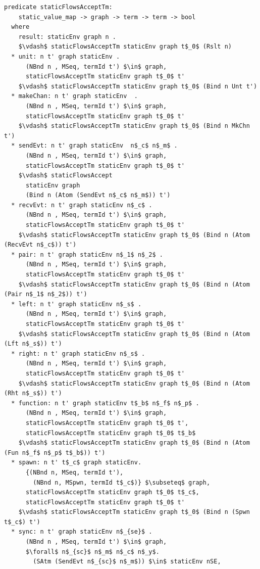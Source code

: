 \documentclass[letterpaper, 11pt]{extarticle}
\begin{document}
\begin{lstlisting}[language=logic, mathescape]
  predicate staticFlowsAcceptTm:
    static_value_map -> graph -> term -> term -> bool
  where
    result: staticEnv graph n .
    $\vdash$ staticFlowsAcceptTm staticEnv graph t$_0$ (Rslt n)
  * unit: n t' graph staticEnv .
      (NBnd n , MSeq, termId t') $\in$ graph,
      staticFlowsAcceptTm staticEnv graph t$_0$ t'
    $\vdash$ staticFlowsAcceptTm staticEnv graph t$_0$ (Bind n Unt t')
  * makeChan: n t' graph staticEnv  .
      (NBnd n , MSeq, termId t') $\in$ graph,
      staticFlowsAcceptTm staticEnv graph t$_0$ t'
    $\vdash$ staticFlowsAcceptTm staticEnv graph t$_0$ (Bind n MkChn t')
  * sendEvt: n t' graph staticEnv  n$_c$ n$_m$ .
      (NBnd n , MSeq, termId t') $\in$ graph,
      staticFlowsAcceptTm staticEnv graph t$_0$ t'
    $\vdash$ staticFlowsAccept
      staticEnv graph
      (Bind n (Atom (SendEvt n$_c$ n$_m$)) t')
  * recvEvt: n t' graph staticEnv n$_c$ .
      (NBnd n , MSeq, termId t') $\in$ graph,
      staticFlowsAcceptTm staticEnv graph t$_0$ t'
    $\vdash$ staticFlowsAcceptTm staticEnv graph t$_0$ (Bind n (Atom (RecvEvt n$_c$)) t')
  * pair: n t' graph staticEnv n$_1$ n$_2$ .
      (NBnd n , MSeq, termId t') $\in$ graph,
      staticFlowsAcceptTm staticEnv graph t$_0$ t'
    $\vdash$ staticFlowsAcceptTm staticEnv graph t$_0$ (Bind n (Atom (Pair n$_1$ n$_2$)) t')
  * left: n t' graph staticEnv n$_s$ .
      (NBnd n , MSeq, termId t') $\in$ graph,
      staticFlowsAcceptTm staticEnv graph t$_0$ t'
    $\vdash$ staticFlowsAcceptTm staticEnv graph t$_0$ (Bind n (Atom (Lft n$_s$)) t')
  * right: n t' graph staticEnv n$_s$ .
      (NBnd n , MSeq, termId t') $\in$ graph,
      staticFlowsAcceptTm staticEnv graph t$_0$ t'
    $\vdash$ staticFlowsAcceptTm staticEnv graph t$_0$ (Bind n (Atom (Rht n$_s$)) t')
  * function: n t' graph staticEnv t$_b$ n$_f$ n$_p$ .
      (NBnd n , MSeq, termId t') $\in$ graph,
      staticFlowsAcceptTm staticEnv graph t$_0$ t',
      staticFlowsAcceptTm staticEnv graph t$_0$ t$_b$
    $\vdash$ staticFlowsAcceptTm staticEnv graph t$_0$ (Bind n (Atom (Fun n$_f$ n$_p$ t$_b$)) t')
  * spawn: n t' t$_c$ graph staticEnv.
      {(NBnd n, MSeq, termId t'),
        (NBnd n, MSpwn, termId t$_c$)} $\subseteq$ graph,
      staticFlowsAcceptTm staticEnv graph t$_0$ t$_c$,
      staticFlowsAcceptTm staticEnv graph t$_0$ t'
    $\vdash$ staticFlowsAcceptTm staticEnv graph t$_0$ (Bind n (Spwn t$_c$) t')
  * sync: n t' graph staticEnv n$_{se}$ .
      (NBnd n , MSeq, termId t') $\in$ graph,
      $\forall$ n$_{sc}$ n$_m$ n$_c$ n$_y$.
        (SAtm (SendEvt n$_{sc}$ n$_m$)) $\in$ staticEnv nSE,

\end{lstlisting}
\end{document}
